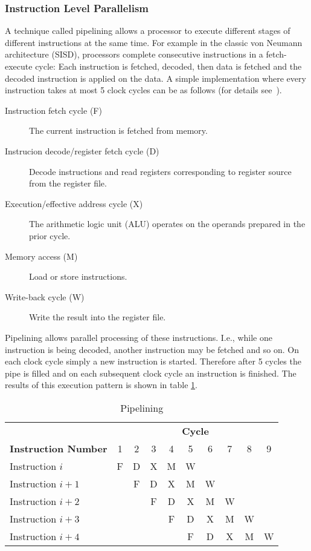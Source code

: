\subsubsection{Instruction Level Parallelism}
A technique called pipelining allows a processor to execute different
stages of different instructions at the same time.
For example in the classic von Neumann architecture (SISD), processors
complete consecutive instructions in a fetch-execute
cycle: Each instruction is fetched, decoded, then data is fetched and
the decoded instruction is applied on the data.
A simple implementation where every instruction takes at most 5 clock
cycles can be as follows (for details see~\cite{CAquant07appendixA}).
\begin{description}
\item[Instruction fetch cycle (F)] The current instruction is fetched from
  memory.
\item[Instrucion decode/register fetch cycle (D)] Decode instructions and
  read registers corresponding to register source from the register
  file.
\item[Execution/effective address cycle (X)] The arithmetic logic unit
  (ALU) operates on the operands prepared in the prior cycle.
\item[Memory access (M)] Load or store instructions.
\item[Write-back cycle (W)] Write the result into the register file.
\end{description}

Pipelining allows parallel processing of these
instructions. I.e., while one instruction is being decoded, another
instruction may be fetched and so on. On each clock cycle simply a new
instruction is started. Therefore after 5 cycles the pipe is filled
and on each subsequent clock cycle an instruction is finished. The
results of this execution pattern is shown in table
\ref{tab:pipelining}.

\begin{table}[h!b!p!]
\caption{Pipelining}
\centering
\begin{tabular}{|l|c|c|c|c|c|c|c|c|c|}
\hline
 & \multicolumn{9}{|c|}{\textbf{Cycle}} \\
\textbf{Instruction Number}
	& 1
	& 2
	& 3
	& 4
	& 5
	& 6
	& 7
	& 8
	& 9
        \\ \hline 
Instruction $i$   & F & D & X & M & W &   &   &   &   \\ \hline
Instruction $i+1$ &   & F & D & X & M & W &   &   &   \\ \hline
Instruction $i+2$ &   &   & F & D & X & M & W &   &   \\ \hline
Instruction $i+3$ &   &   &   & F & D & X & M & W &   \\ \hline
Instruction $i+4$ &   &   &   &   & F & D & X & M & W \\ \hline
\end{tabular}
\label{tab:pipelining}
\end{table}

